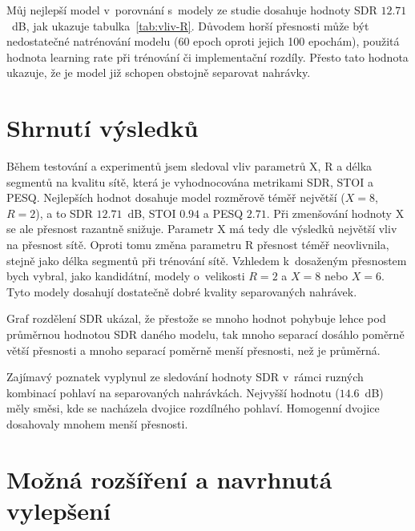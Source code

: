 Můj nejlepší model v~porovnání s~modely ze studie dosahuje hodnoty SDR $12.71$~dB, jak ukazuje tabulka~\ref{tab:vliv-R}. Důvodem horší přesnosti může být nedostatečné natrénování modelu (60 epoch oproti jejich 100 epochám), použitá hodnota learning rate při trénování či implementační rozdíly. Přesto tato hodnota ukazuje, že je model již schopen obstojně separovat nahrávky.


\section{Shrnutí výsledků}


Během testování a experimentů jsem sledoval vliv parametrů X, R a délka segmentů na kvalitu sítě, která je vyhodnocována metrikami SDR, STOI a PESQ. Nejlepších hodnot dosahuje model rozměrově téměř největší ($X = 8$, $R=2$), a to SDR $12.71$~dB, STOI $0.94$ a PESQ $2.71$. Při zmenšování hodnoty X se ale přesnost razantně snižuje. Parametr X má tedy dle výsledků největší vliv na přesnost sítě. Oproti tomu změna parametru R přesnost téměř neovlivnila, stejně jako délka segmentů při trénování sítě. Vzhledem k~dosaženým přesnostem bych vybral, jako kandidátní, modely o~velikosti $R=2$ a $X=8$ nebo $X=6$. Tyto modely dosahují dostatečně dobré kvality separovaných nahrávek.



Graf rozdělení SDR ukázal, že přestože se mnoho hodnot pohybuje lehce pod průměrnou hodnotou SDR daného modelu, tak mnoho separací dosáhlo poměrně větší přesnosti a mnoho separací poměrně menší přesnosti, než je průměrná.

Zajímavý poznatek vyplynul ze sledování hodnoty SDR v~rámci ruzných kombinací pohlaví na separovaných nahrávkách. Nejvyšší hodnotu ($14.6$~dB) měly směsi, kde se nacházela dvojice rozdílného pohlaví. Homogenní dvojice dosahovaly mnohem menší přesnosti.


\section{Možná rozšíření a navrhnutá vylepšení}

